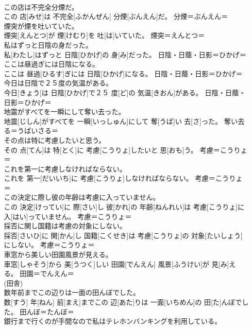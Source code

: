 \documentclass[8pt]{extreport}
\begin{document}
\begin{CJK}{UTF8}{min}
{\\	この店は不完全分煙だ。	
\\	この 店[みせ]は 不完全[ふかんぜん] 分煙[ぶんえん]だ。	分煙＝ぶんえん＝ 
\\	煙突が煙を吐いていた。	
\\	煙突[えんとつ]が 煙[けむり]を 吐[は]いていた。	煙突＝えんとつ＝ 
\\	私はずっと日陰の身だった。	
\\	私[わたし]はずっと 日陰[ひかげ]の 身[み]だった。	日陰・日蔭・日影＝ひかげ＝ 
\\	ここは昼過ぎには日陰になる。	
\\	ここは 昼過[ひるす]ぎには 日陰[ひかげ]になる。	日陰・日蔭・日影＝ひかげ＝ 
\\	今日は日陰で２５度の気温がある。	
\\	今日[きょう]は 日陰[ひかげ]で２５ 度[ど]の 気温[きおん]がある。	日陰・日蔭・日影＝ひかげ＝ 
\\	地震がすべてを一瞬にして奪い去った。	
\\	地震[じしん]がすべてを 一瞬[いっしゅん]にして 奪[うば]い 去[さ]った。	奪い去る＝うばいさる＝ 
\\	その点は特に考慮したいと思う。	
\\	その 点[てん]は 特[とく]に 考慮[こうりょ]したいと 思[おも]う。	考慮＝こうりょ＝ 
\\	これを第一に考慮しなければならない。	
\\	これを 第一[だいいち]に 考慮[こうりょ]しなければならない。	考慮＝こうりょ＝ 
\\	この決定に際し彼の年齢は考慮に入っていません。	
\\	この 決定[けってい]に 際[さい]し 彼[かれ]の 年齢[ねんれい]は 考慮[こうりょ]に 入[はい]っていません。	考慮＝こうりょ＝ 
\\	採否に関し国籍は考慮の対象にしない。	
\\	採否[さいひ]に 関[かん]し 国籍[こくせき]は 考慮[こうりょ]の 対象[たいしょう]にしない。	考慮＝こうりょ＝ 
\\	車窓から美しい田園風景が見える。	
\\	車窓[しゃそう]から 美[うつく]しい 田園[でんえん] 風景[ふうけい]が 見[み]える。	田園＝でんえん＝ 
\\	(田舎) 
\\	数年前までこの辺りは一面の田んぼでした。	
\\	数[すう] 年[ねん] 前[まえ]までこの 辺[あた]りは 一面[いちめん]の 田[た]んぼでした。	田んぼ＝たんぼ＝ 
\\	銀行まで行くのが手間なので私はテレホンバンキングを利用している。	
}
\end{CJK}
\end{document}
